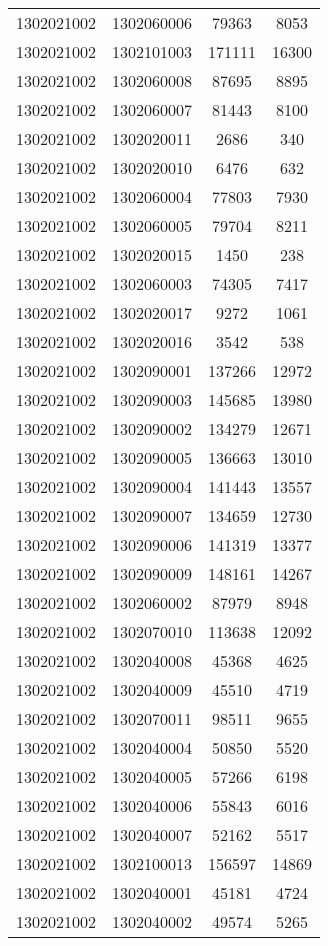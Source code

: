\begin{longtable}{llcc}
1302021002 & 1302060006 & 79363 & 8053\\
1302021002 & 1302101003 & 171111 & 16300\\
1302021002 & 1302060008 & 87695 & 8895\\
1302021002 & 1302060007 & 81443 & 8100\\
1302021002 & 1302020011 & 2686 & 340\\
1302021002 & 1302020010 & 6476 & 632\\
1302021002 & 1302060004 & 77803 & 7930\\
1302021002 & 1302060005 & 79704 & 8211\\
1302021002 & 1302020015 & 1450 & 238\\
1302021002 & 1302060003 & 74305 & 7417\\
1302021002 & 1302020017 & 9272 & 1061\\
1302021002 & 1302020016 & 3542 & 538\\
1302021002 & 1302090001 & 137266 & 12972\\
1302021002 & 1302090003 & 145685 & 13980\\
1302021002 & 1302090002 & 134279 & 12671\\
1302021002 & 1302090005 & 136663 & 13010\\
1302021002 & 1302090004 & 141443 & 13557\\
1302021002 & 1302090007 & 134659 & 12730\\
1302021002 & 1302090006 & 141319 & 13377\\
1302021002 & 1302090009 & 148161 & 14267\\
1302021002 & 1302060002 & 87979 & 8948\\
1302021002 & 1302070010 & 113638 & 12092\\
1302021002 & 1302040008 & 45368 & 4625\\
1302021002 & 1302040009 & 45510 & 4719\\
1302021002 & 1302070011 & 98511 & 9655\\
1302021002 & 1302040004 & 50850 & 5520\\
1302021002 & 1302040005 & 57266 & 6198\\
1302021002 & 1302040006 & 55843 & 6016\\
1302021002 & 1302040007 & 52162 & 5517\\
1302021002 & 1302100013 & 156597 & 14869\\
1302021002 & 1302040001 & 45181 & 4724\\
1302021002 & 1302040002 & 49574 & 5265\\

\end{longtable}
